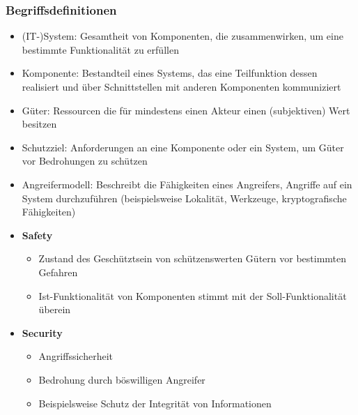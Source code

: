 \subsubsection{Begriffsdefinitionen}
\begin{itemize}
	\item (IT-)System: Gesamtheit von Komponenten, die zusammenwirken, um eine bestimmte Funktionalität zu erfüllen
	\item Komponente: Bestandteil eines Systems, das eine Teilfunktion dessen realisiert und über Schnittstellen mit anderen Komponenten kommuniziert
	\item Güter: Ressourcen die für mindestens einen Akteur einen (subjektiven) Wert besitzen
	\item Schutzziel: Anforderungen an eine Komponente oder ein System, um Güter vor Bedrohungen zu schützen
	\item Angreifermodell: Beschreibt die Fähigkeiten eines Angreifers, Angriffe auf ein System durchzuführen (beispielsweise Lokalität, Werkzeuge, kryptografische Fähigkeiten)
	\item \textbf{Safety}
	\begin{itemize}
		\item Zustand des Geschütztsein von schützenswerten Gütern vor bestimmten Gefahren
		\item Ist-Funktionalität von Komponenten stimmt mit der Soll-Funktionalität überein
	\end{itemize}
	\item \textbf{Security}
	\begin{itemize}
		\item Angriffssicherheit
		\item Bedrohung durch böswilligen Angreifer
		\item Beispielsweise Schutz der Integrität von Informationen
	\end{itemize}
\end{itemize}


